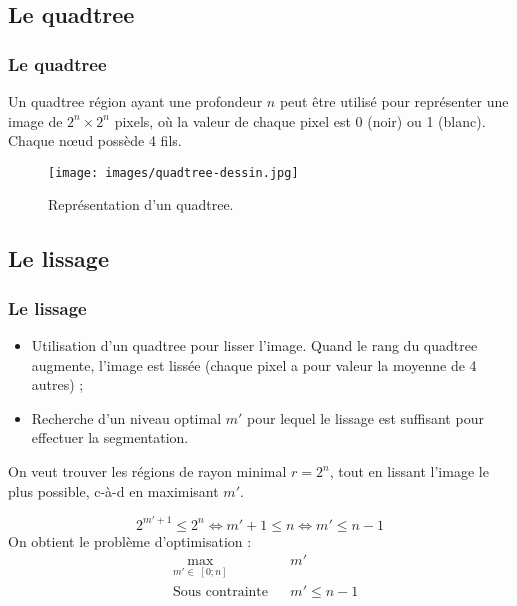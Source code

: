 \documentclass[handout]{beamer}
\begin{document}
		\subsection{Le quadtree}
		\begin{frame}
			\frametitle{Le quadtree}

			Un quadtree région ayant une profondeur $n$ peut être utilisé pour représenter une image de $2^n \times 2^n$ pixels, où la valeur de chaque pixel est 0 (noir) ou 1 (blanc). Chaque nœud possède 4 fils.
			\begin{figure}[H]
				\centering
				\texttt{[image: images/quadtree-dessin.jpg]}
				\caption{Représentation d'un quadtree.}
				\label{fig:quadtree2}
			\end{figure}
		\end{frame}

		\subsection{Le lissage}
		\begin{frame}
			\frametitle{Le lissage}
				\begin{itemize}
					\item Utilisation d'un quadtree pour lisser l'image. Quand le rang du quadtree augmente, l'image est lissée (chaque pixel a pour valeur la moyenne de 4 autres) ;
					\item Recherche d'un niveau optimal $m'$ pour lequel le lissage est suffisant pour effectuer la segmentation.
				\end{itemize}

				On veut trouver les régions de rayon minimal $r = 2^n$, tout en lissant l'image le plus possible, c-à-d en maximisant $m'$.

				\[2^{m' + 1} \leq 2^n \Leftrightarrow m'+1 \leq n \Leftrightarrow m' \leq n - 1\]
				On obtient le problème d'optimisation :
				\begin{equation*}
				\begin{aligned}
					& \underset{m' \in\; [0; n]}{\text{max}}
					& & m' \\
					& \text{Sous contrainte}
					& & m' \leq n - 1
					\end{aligned}
				\end{equation*}
		\end{frame}
\end{document}
